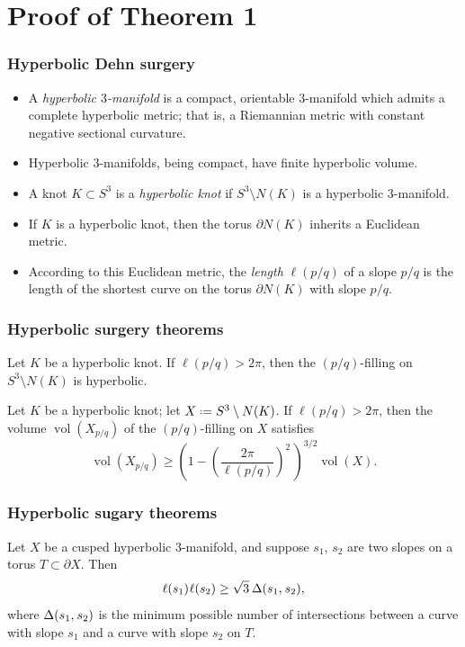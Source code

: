 \documentclass{beamer}
\newcommand{\vol}{\operatorname{vol}}
\newcommand{\defeq}{\mathrel{\vcenter{\baselineskip0.5ex\lineskiplimit0pt\hbox{\scriptsize.}\hbox{\scriptsize.}}}=}
\newcommand{\hs}{\hspace{0.05em}} %
\theoremstyle{ex}
\theoremstyle{rem}
\begin{document}
\section{Proof of Theorem 1}
	
	\begin{frame}
		\frametitle{Hyperbolic Dehn surgery}
		\begin{itemize}
			\item A \textit{hyperbolic $3$-manifold} is a compact, orientable $3$-manifold which admits a complete hyperbolic metric; that is, a Riemannian metric with constant negative sectional curvature.
			\item Hyperbolic $3$-manifolds, being compact, have finite hyperbolic volume.
			\item A knot $K\subset S^3$ is a \textit{hyperbolic knot} if $S^3\setminus N(K)$ is a hyperbolic $3$-manifold.
			\item If $K$ is a hyperbolic knot, then the torus $\partial N(K)$ inherits a Euclidean metric.
			\item According to this Euclidean metric, the \textit{length} $\ell(p/q)$ of a slope $p/q$ is the length of the shortest curve on the torus $\partial N(K)$ with slope $p/q$.
		\end{itemize}
	\end{frame}
	
	\begin{frame}
		\frametitle{Hyperbolic surgery theorems}
		\begin{theorem}
			Let $K$ be a hyperbolic knot. If $\ell(p/q)>2\pi$, then the $(p/q)$-filling on $S^3\setminus N(K)$ is hyperbolic.
		\end{theorem}
		\begin{theorem}[Futer, et al.]
			Let $K$ be a hyperbolic knot; let $X\defeq S^3\setminus N(K)$. If $\ell(p/q)>2\pi$, then the volume $\vol(X_{p/q})$ of the $(p/q)$-filling on $X$ satisfies
			\[\vol(X_{p/q})\ge\left(1-\left(\frac{2\pi}{\ell(p/q)}\right)^2\,\right)^{3/2}\vol(X).\]
		\end{theorem}
	\end{frame}
	
	\begin{frame}
		\frametitle{Hyperbolic sugary theorems}
		\begin{theorem}
			Let $X$ be a cusped hyperbolic $3$-manifold, and suppose $s_1$, $s_2$ are two slopes on a torus $T\subset \partial X$. Then
			\[\ell(s_1)\hs\ell(s_2)\ge\sqrt{3}\hspace{0.2em}\Delta(s_1,\hs s_2),\]
			where $\Delta(s_1,\hs s_2)$ is the minimum possible number of intersections between a curve with slope $s_1$ and a curve with slope $s_2$ on $T$.
		\end{theorem}
	\end{frame}
	
\end{document}
